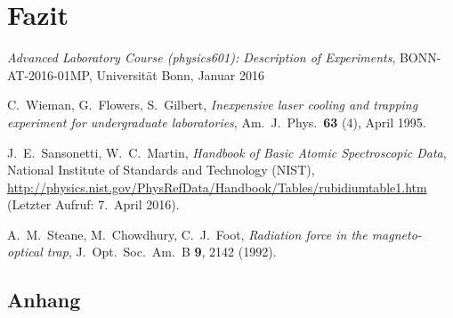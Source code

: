 \documentclass[11pt, a4paper]{article}
\numberwithin{equation}{section}
\begin{document}
\section{Fazit}


\FloatBarrier
\vspace{\fill}
\begin{thebibliography}{19}
	\emph{Advanced Laboratory Course (physics601): Description of Experiments}, BONN-AT-2016-01MP, Universität Bonn, Januar 2016

	C.\ Wieman, G.\ Flowers, S.\ Gilbert,
	\emph{Inexpensive laser cooling and trapping experiment for undergraduate laboratories},
	Am.\ J.\ Phys.\ \textbf{63} (4), April 1995.

	J.\ E.\ Sansonetti, W.\ C.\ Martin,
	\emph{Handbook of Basic Atomic Spectroscopic Data},
	National Institute of Standards and Technology (NIST), \url{http://physics.nist.gov/PhysRefData/Handbook/Tables/rubidiumtable1.htm} (Letzter Aufruf: 7.\ April 2016).

	A.\ M.\ Steane, M.\ Chowdhury, C.\ J.\ Foot,
	\emph{Radiation force in the magneto-optical trap},
	J.\ Opt.\ Soc.\ Am.\ B \textbf{9}, 2142 (1992).
	
\end{thebibliography}

\begin{appendix}
\newpage
\section{Anhang}
\end{appendix}
\end{document}
